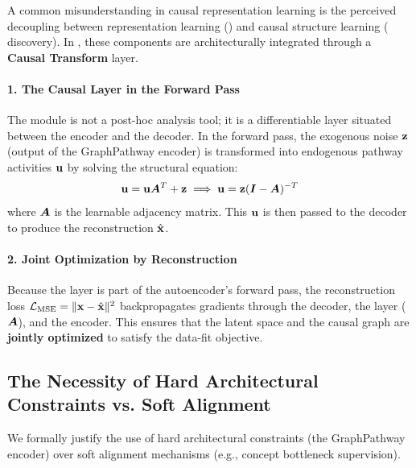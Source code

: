 A common misunderstanding in causal representation learning is the perceived decoupling between representation learning () and causal structure learning ( discovery). In , these components are architecturally integrated through a \textbf{Causal Transform} layer.

\paragraph{1. The Causal Layer in the Forward Pass}
The  module is not a post-hoc analysis tool; it is a differentiable layer situated between the encoder and the decoder. In the forward pass, the exogenous noise ${\mathbf{z}}$ (output of the GraphPathway encoder) is transformed into endogenous pathway activities ${\mathbf{u}}$ by solving the structural equation:
\begin{equation}
    {\mathbf{u}} = {\mathbf{u}} {\bm{A}}^T + {\mathbf{z}} \implies {\mathbf{u}} = {\mathbf{z}}({\bm{I}} - {\bm{A}})^{-T}
\end{equation}
where ${\bm{A}}$ is the learnable adjacency matrix. This ${\mathbf{u}}$ is then passed to the decoder to produce the reconstruction $\hat{{\mathbf{x}}}$.

\paragraph{2. Joint Optimization by Reconstruction}
Because the  layer is part of the autoencoder's forward pass, the reconstruction loss $\mathcal{L}_{\text{MSE}} = \|{\mathbf{x}} - \hat{{\mathbf{x}}}\|^2$ backpropagates gradients through the decoder, the  layer (${\bm{A}}$), and the encoder. This ensures that the latent space and the causal graph are \textbf{jointly optimized} to satisfy the data-fit objective. 

\subsection{The Necessity of Hard Architectural Constraints vs. Soft Alignment}
\label{app:arch:hard_vs_soft}

We formally justify the use of hard architectural constraints (the GraphPathway encoder) over soft alignment mechanisms (e.g., concept bottleneck supervision).

